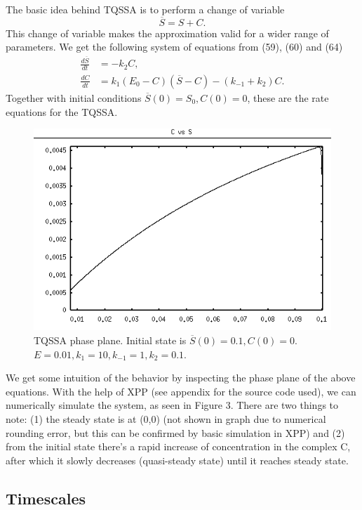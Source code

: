 \documentclass[12pt]{article}
\begin{document}
The basic idea behind TQSSA is to perform a change of variable
\begin{equation}
\overline{S} = S + C.
\end{equation}
This change of variable makes the approximation valid for a wider
range of parameters. We get the following system of equations from
(59), (60) and (64)
\begin{align}
\frac{d\overline{S}}{dt} &= - k_2 C, \\
\frac{dC}{dt} &= k_1(E_0-C)(\overline{S}-C)-(k_{-1}+ k_2) C.
\end{align}
Together with initial conditions $\overline{S}(0)=S_0, C(0)=0$, these
are the rate equations for the TQSSA.
\begin{figure}[ht!]
\centering
\includegraphics[width=120mm]
{tqssa-phase-plane-b.png}
\caption{TQSSA phase plane. Initial state is $\overline{S}(0)=0.1,
  C(0)=0$. $E=0.01, k_1=10, k_{-1}=1, k_2=0.1$.}
\label{overflow}
\end{figure}

We get some intuition of the behavior by inspecting the phase plane of
the above equations. With the help of XPP (see appendix for the source
code used), we can numerically simulate the system, as seen in Figure
3. There are two things to note: (1) the steady state is at (0,0) (not
shown in graph due to numerical rounding error, but this can be
confirmed by basic simulation in XPP) and (2) from the initial state
there's a rapid increase of concentration in the complex C, after
which it slowly decreases (quasi-steady state) until it reaches steady
state.

\subsection{Timescales}
\end{document}

